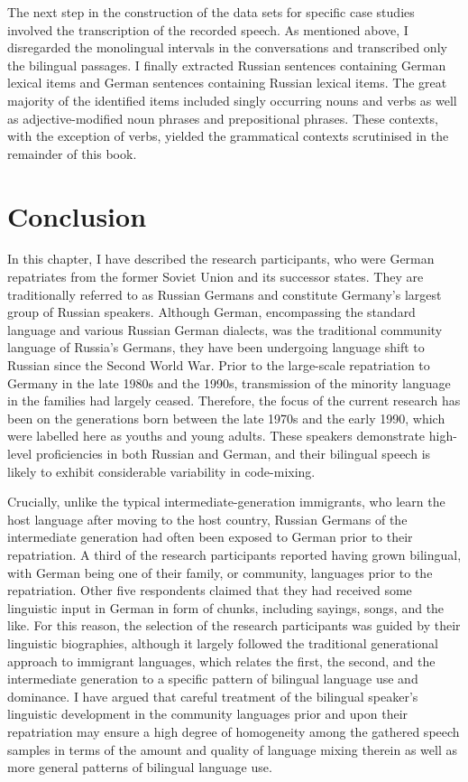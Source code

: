 The next step in the construction of the data sets for specific case studies involved the transcription of the recorded speech. As mentioned above, I disregarded the monolingual intervals in the conversations and transcribed only the bilingual passages. I finally extracted Russian sentences containing German lexical items and German sentences containing Russian lexical items. The great majority of the identified items included singly occurring nouns and verbs as well as adjective-modified noun phrases and prepositional phrases. These contexts, with the exception of verbs, yielded the grammatical contexts scrutinised in the remainder of this book. 

\section{Conclusion}
In this chapter, I have described the research participants, who were German repatriates from the former Soviet Union and its successor states. They are traditionally referred to as Russian Germans and constitute  Germany's largest group of Russian speakers. Although German, encompassing the standard language and various Russian German dialects, was the traditional community language of Russia's Germans, they have been undergoing language shift to Russian since the Second World War. Prior to the large-scale repatriation to Germany in the late 1980s and the 1990s, transmission of the minority language in the families had largely ceased. Therefore, the focus of the current research has been on the generations born between the late 1970s and the early 1990, which were labelled here as youths and young adults. These speakers demonstrate high-level proficiencies in both Russian and German, and their bilingual speech is likely to exhibit considerable variability in code-mixing. 

Crucially, unlike the typical intermediate-generation immigrants, who learn the host language after moving to the host country, Russian Germans of the intermediate generation had often been exposed to German prior to their repatriation. A third of the research participants reported having grown bilingual, with German being one of their family, or community, languages prior to the repatriation. Other five respondents claimed that they had received some linguistic input in German in form of chunks, including sayings, songs, and the like. For this reason, the selection of the research participants was guided by their linguistic biographies, although it largely followed the traditional generational approach to immigrant languages, which relates the first, the second, and the intermediate generation to a specific pattern of bilingual language use and dominance. I have argued that careful treatment of the bilingual speaker's linguistic development in the community languages prior and upon their repatriation may ensure a high degree of homogeneity among the gathered speech samples in terms of the amount and quality of language mixing therein as well as more general patterns of bilingual language use.


